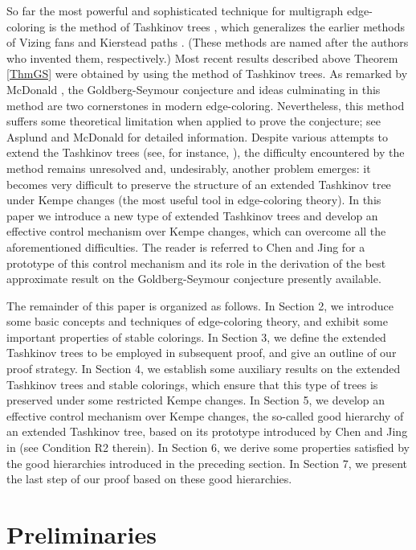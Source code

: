 \documentclass[11pt]{article}
\begin{document}
So far the most powerful and sophisticated technique for multigraph edge-coloring is the method of Tashkinov trees
\cite{T}, which generalizes the earlier methods of Vizing fans \cite{V} and Kierstead paths \cite{Ki}. (These
methods are named after the authors who invented them, respectively.) Most recent results described above 
Theorem \ref{ThmGS} were obtained by using the method of Tashkinov trees. As remarked by McDonald \cite{Mc}, the 
Goldberg-Seymour conjecture and ideas culminating in this method are two cornerstones in modern edge-coloring. Nevertheless, 
this method suffers some theoretical limitation when applied to prove the conjecture; see 
Asplund and McDonald \cite{AM} for detailed information. Despite various attempts to extend the Tashkinov trees (see, for 
instance, \cite{GT,GG,CYZ,S,SSTF}), the difficulty encountered by the method remains unresolved and, undesirably, another
problem emerges: it becomes very difficult to preserve the structure of an extended Tashkinov tree under Kempe changes 
(the most useful tool in edge-coloring theory). In this paper we introduce a new type of extended Tashkinov trees and 
develop an effective control mechanism over Kempe changes, which can overcome all the aforementioned difficulties.   
The reader is referred to Chen and Jing \cite{GG} for a prototype of this control mechanism and its role
in the derivation of the best approximate result on the Goldberg-Seymour conjecture presently available. 


\vskip 2mm 

The remainder of this paper is organized as follows. In Section 2, we introduce some basic concepts and 
techniques of edge-coloring theory, and exhibit some important properties of stable colorings. 
In Section 3, we define the extended Tashkinov trees to be employed in subsequent proof, and give an outline 
of our proof strategy. In Section 4, we establish some auxiliary results on the extended Tashkinov trees
and stable colorings, which ensure that this type of trees is preserved under some restricted Kempe changes.  In Section 5, 
we develop an effective control mechanism over Kempe changes, the so-called good hierarchy of an extended 
Tashkinov tree, based on its prototype introduced by Chen and Jing in \cite{GG} (see Condition R2 therein).
In Section 6, we derive some properties satisfied by the good hierarchies introduced in the preceding section. 
In Section 7, we present the last step of our proof based on these good hierarchies. 

\section{Preliminaries}
\end{document}
